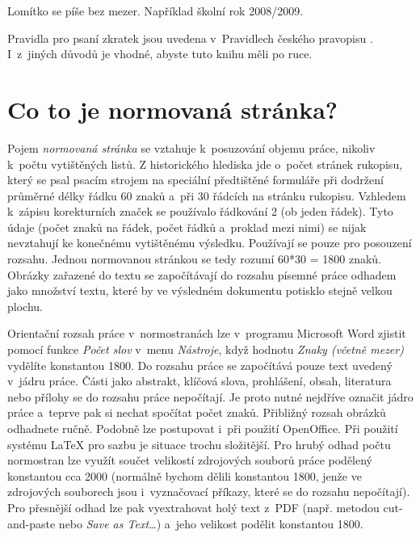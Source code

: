 Lomítko se píše bez mezer. Například školní rok 2008/2009.

Pravidla pro psaní zkratek jsou uvedena v~Pravidlech českého pravopisu \cite{Pravidla}. I~z~jiných důvodů je vhodné, abyste tuto knihu měli po ruce. 


\section{Co to je normovaná stránka?}
Pojem {\it normovaná stránka} se vztahuje k~posuzování objemu práce, nikoliv k~počtu vytištěných listů. Z historického hlediska jde o~počet stránek rukopisu, který se psal psacím strojem na speciální předtištěné formuláře při dodržení průměrné délky řádku 60 znaků a~při 30 řádcích na stránku rukopisu. Vzhledem k~zápisu korekturních značek se používalo řádkování 2 (ob jeden řádek). Tyto údaje (počet znaků na řádek, počet řádků a~proklad mezi nimi) se nijak nevztahují ke konečnému vytištěnému výsledku. Používají se pouze pro posouzení rozsahu. Jednou normovanou stránkou se tedy rozumí 60*30 = 1800 znaků. Obrázky zařazené do textu se započítávají do rozsahu písemné práce odhadem jako množství textu, které by ve výsledném dokumentu potisklo stejně velkou plochu.

Orientační rozsah práce v~normostranách lze v~programu Microsoft Word zjistit pomocí funkce {\it Počet slov} v~menu {\it Nástroje}, když hodnotu {\it Znaky (včetně mezer)} vydělíte konstantou 1800. Do rozsahu práce se započítává pouze text uvedený v~jádru práce. Části jako abstrakt, klíčová slova, prohlášení, obsah, literatura nebo přílohy se do rozsahu práce nepočítají. Je proto nutné nejdříve označit jádro práce a~teprve pak si nechat spočítat počet znaků. Přibližný rozsah obrázků odhadnete ručně. Podobně lze postupovat i~při použití OpenOffice. Při použití systému LaTeX pro sazbu je situace trochu složitější. Pro hrubý odhad počtu normostran lze využít součet velikostí zdrojových souborů práce podělený konstantou cca 2000 (normálně bychom dělili konstantou 1800, jenže ve zdrojových souborech jsou i~vyznačovací příkazy, které se do rozsahu nepočítají). Pro přesnější odhad lze pak vyextrahovat holý text z~PDF (např. metodou cut-and-paste nebo {\it Save as Text\ldots}) a~jeho velikost podělit konstantou 1800. 




